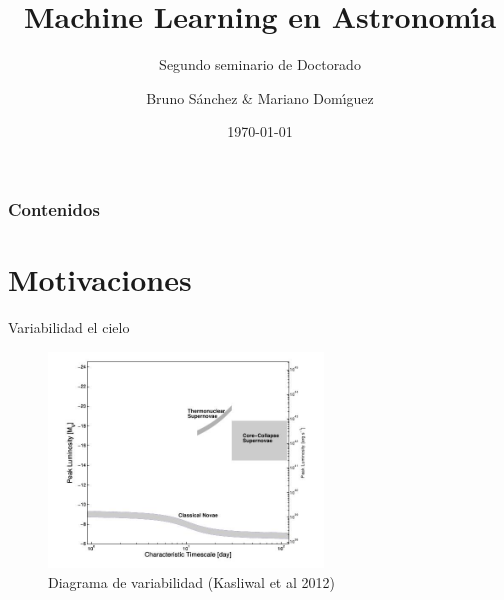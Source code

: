 \documentclass[11pt]{beamer}
\title{Machine Learning en Astronom\'{\i}a}
\subtitle{Segundo seminario de Doctorado}
\author{Bruno S\'anchez \& 
Mariano Dom\'{\i}guez}
\institute{IATE - FaMAFyC} %
\date{\today}
\begin{document}
\begin{frame}[plain]
\maketitle
\end{frame}


\begin{frame}
\frametitle{Contenidos}
\tableofcontents%
\end{frame}


\section{Motivaciones}

\begin{frame}{Variabilidad el cielo}
    \begin{figure}
        \centering
        \includegraphics[width=0.65\textwidth]{./images/imgs_seminario1/diag1.jpeg}
        \caption{Diagrama de variabilidad (Kasliwal et al 2012)}
        \label{fig:diag_vacio}
    \end{figure}
\end{frame}
\end{document}
